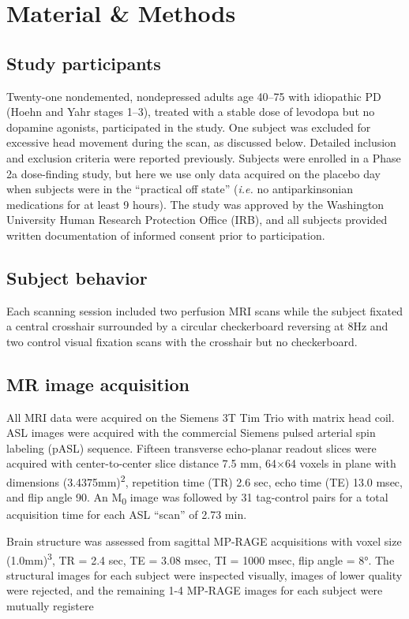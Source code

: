 \section{Material \& Methods}

\subsection{Study participants}
Twenty-one nondemented, nondepressed adults age 40–75 with idiopathic PD (Hoehn and Yahr stages 1–3),\cite{6067254} treated with a stable dose of levodopa but no dopamine agonists, participated in the study. One subject was excluded for excessive head movement during the scan, as discussed below. Detailed inclusion and exclusion criteria were reported previously.\cite{SYN115_2010_AAN_RCT} Subjects were enrolled in a Phase 2a dose-finding study,\cite{Black_2010} but here we use only data acquired on the placebo day when subjects were in the ``practical off state'' (\textit{i.e.} no antiparkinsonian medications for at least 9 hours). The study was approved by the Washington University Human Research Protection Office (IRB), and all subjects provided written documentation of informed consent prior to participation.

\subsection{Subject behavior}
Each scanning session included two perfusion MRI scans while the subject fixated a central crosshair surrounded by a circular checkerboard reversing at 8Hz and two control visual fixation scans with the crosshair but no checkerboard. 

\subsection{MR image acquisition}
All MRI data were acquired on the Siemens 3T Tim Trio with matrix head coil. ASL images were acquired with the commercial Siemens pulsed arterial spin labeling (pASL) sequence.\cite{Wang_2003} Fifteen transverse echo-planar readout slices were acquired with center-to-center slice distance 7.5 mm, 64$\times$64 voxels in plane with dimensions (3.4375mm)\textsuperscript{2}, repetition time (TR) 2.6 sec, echo time (TE) 13.0 msec, and flip angle 90\textdegree. An M\textsubscript{0} image was followed by 31 tag-control pairs for a total acquisition time for each ASL ``scan'' of 2.73 min.

Brain structure was assessed from sagittal MP-RAGE acquisitions with voxel size (1.0mm)\textsuperscript{3}, TR = 2.4 sec, TE = 3.08 msec, TI = 1000 msec, flip angle = 8°. The structural images for each subject were inspected visually, images of lower quality were rejected, and the remaining 1-4 MP-RAGE images for each subject were mutually registere

